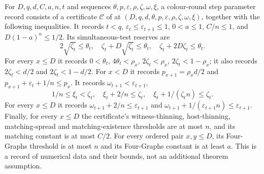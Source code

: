 \begin{definition}
For $D,q,d,C,a,n,t$ and sequences $\theta,p,\varepsilon,\rho,\zeta,
\omega,\xi$, a colour-round step parameter record consists of a certificate
$\mathcal C$ of  at
$(D,q,d,\theta,p,\varepsilon,\rho,\zeta,\omega,\xi)$, together with the
following inequalities. It records $t<q$,
$\varepsilon_t\le\varepsilon_{t+1}\le1$, $0<a\le1$, $C/n\le1$, and
$D(1-a)^n\le1/2$. Its simultaneous-test reserves are
\[
2\sqrt{\zeta_t}\le\theta_t,\quad
\zeta_t+D\sqrt{\zeta_t}\le\theta_t,\quad
\zeta_t+2D\zeta_t\le\theta_t.
\]
For every $x\le D$ it records $0<\theta_t$, $4\theta_t<\rho_x$,
$2\zeta_t<\rho_x$, $2\zeta_t<1-\rho_x$; it also records
$2\zeta_t<d/2$ and $2\zeta_t<1-d/2$.
For $x<D$ it records $p_{x+1}=\rho_xd/2$ and
$p_{x+1}+\varepsilon_t+1/n\le p_x$.
It records $\omega_{t+1}<\varepsilon_{t+1}$,
\[
1/n\le\xi_t<\zeta_t,\quad \xi_t+2/n\le\zeta_t,\quad
\xi_t+1/(\zeta_t n)\le\zeta_t.
\]
For every $x\le D$ it records
$\omega_{t+1}+2/n\le\varepsilon_{t+1}$ and
$\omega_{t+1}+1/(\varepsilon_{t+1}n)\le\varepsilon_{t+1}$.
Finally, for every $x\le D$ the certificate's witness-thinning,
host-thinning, matching-spread and matching-existence thresholds are at
most $n$, and its matching constant is at most $C/2$. For every ordered
pair $x,y\le D$, its Four-Graphs threshold is at most $n$ and its
Four-Graphs constant is at least $a$. This is a record of numerical
data and their bounds, not an additional theorem assumption.
\end{definition}
